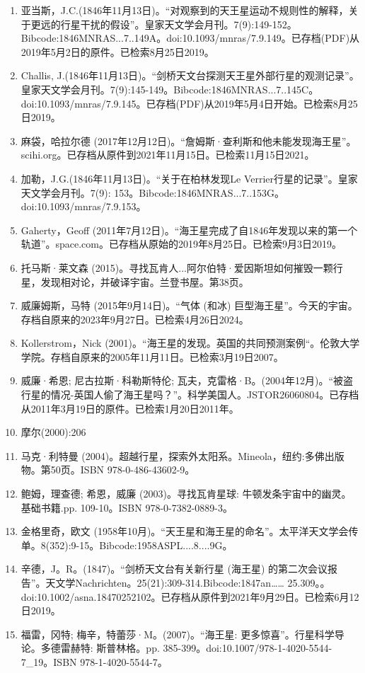 \begin{enumerate}
\item 亚当斯，J.C.(1846年11月13日)。“对观察到的天王星运动不规则性的解释，关于更远的行星干扰的假设”。皇家天文学会月刊。7(9):149-152。Bibcode:1846MNRAS...7..149A。doi:10.1093/mnras/7.9.149。已存档(PDF)从2019年5月2日的原件。已检索8月25日2019。
\item Challis, J.(1846年11月13日)。“剑桥天文台探测天王星外部行星的观测记录”。皇家天文学会月刊。7(9):145-149。Bibcode:1846MNRAS...7..145C。doi:10.1093/mnras/7.9.145。已存档(PDF)从2019年5月4日开始。已检索8月25日2019。
\item 麻袋，哈拉尔德 (2017年12月12日)。“詹姆斯·查利斯和他未能发现海王星”。scihi.org。已存档从原件到2021年11月15日。已检索11月15日2021。
\item 加勒，J.G.(1846年11月13日)。“关于在柏林发现Le Verrier行星的记录”。皇家天文学会月刊。7(9): 153。Bibcode:1846MNRAS...7..153G。doi:10.1093/mnras/7.9.153。
\item Gaherty，Geoff (2011年7月12日)。“海王星完成了自1846年发现以来的第一个轨道”。space.com。已存档从原始的2019年8月25日。已检索9月3日2019。
\item 托马斯·莱文森 (2015)。寻找瓦肯人...阿尔伯特·爱因斯坦如何摧毁一颗行星，发现相对论，并破译宇宙。兰登书屋。第38页。
\item 威廉姆斯，马特 (2015年9月14日)。“气体 (和冰) 巨型海王星”。今天的宇宙。存档自原来的2023年9月27日。已检索4月26日2024。
\item Kollerstrom，Nick (2001)。“海王星的发现。英国的共同预测案例“。伦敦大学学院。存档自原来的2005年11月11日。已检索3月19日2007。
\item 威廉·希恩; 尼古拉斯·科勒斯特伦; 瓦夫，克雷格·B。(2004年12月)。“被盗行星的情况-英国人偷了海王星吗？”。科学美国人。JSTOR26060804。已存档从2011年3月19日的原件。已检索1月20日2011年。 
\item 摩尔(2000):206
\item 马克·利特曼 (2004)。超越行星，探索外太阳系。Mineola，纽约:多佛出版物。第50页。ISBN 978-0-486-43602-9。
\item 鲍姆，理查德; 希恩，威廉 (2003)。寻找瓦肯星球: 牛顿发条宇宙中的幽灵。基础书籍.pp. 109-10。ISBN 978-0-7382-0889-3。
\item 金格里奇，欧文 (1958年10月)。“天王星和海王星的命名”。太平洋天文学会传单。8(352):9-15。Bibcode:1958ASPL....8....9G。
\item 辛德，J。R。(1847)。“剑桥天文台有关新行星 (海王星) 的第二次会议报告”。天文学Nachrichten。25(21):309-314.Bibcode:1847an…… 25.309。。doi:10.1002/asna.18470252102。已存档从原件到2021年9月29日。已检索6月12日2019。
\item 福雷，冈特; 梅辛，特蕾莎·M。(2007)。“海王星: 更多惊喜”。行星科学导论。多德雷赫特: 斯普林格。pp. 385-399。doi:10.1007/978-1-4020-5544-7_19。ISBN 978-1-4020-5544-7。

\end{enumerate}
